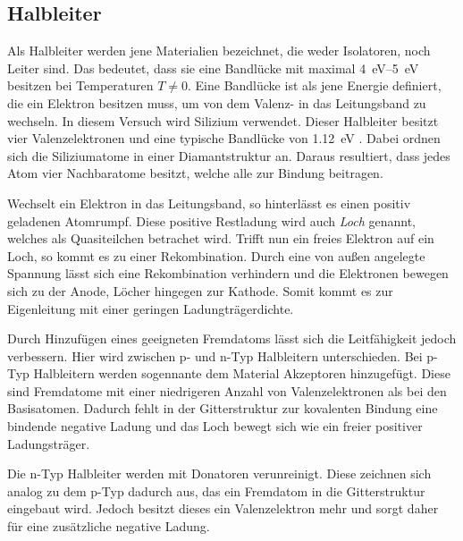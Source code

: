 \subsection{Halbleiter}
\label{sec:Halbleiter-Theorie}
Als Halbleiter werden jene Materialien bezeichnet, die weder Isolatoren, noch Leiter
sind. Das bedeutet, dass sie eine Bandlücke mit maximal \SIrange{4}{5}{\electronvolt}
besitzen bei Temperaturen $T \neq 0$. Eine Bandlücke ist
als jene Energie definiert, die ein Elektron besitzen muss, um von dem Valenz-
in das Leitungsband zu wechseln.
In diesem Versuch wird Silizium verwendet. Dieser Halbleiter besitzt vier
Valenzelektronen und eine typische Bandlücke von \SI{1.12}{\electronvolt} \cite{chemie}.
Dabei ordnen sich die Siliziumatome in einer Diamantstruktur an. Daraus
resultiert, dass jedes Atom vier Nachbaratome besitzt, welche alle zur Bindung
beitragen.

Wechselt ein Elektron in das Leitungsband, so hinterlässt es einen positiv
geladenen Atomrumpf. Diese positive Restladung wird auch \textit{Loch} genannt,
welches als Quasiteilchen betrachet wird. Trifft nun ein freies Elektron auf ein
Loch, so kommt es zu einer Rekombination. Durch eine von außen angelegte Spannung
lässt sich eine Rekombination verhindern und die Elektronen bewegen sich
zu der Anode, Löcher hingegen zur Kathode. Somit kommt es zur Eigenleitung
mit einer geringen Ladungträgerdichte.

Durch Hinzufügen eines geeigneten Fremdatoms lässt sich die Leitfähigkeit jedoch verbessern.
Hier wird zwischen p- und n-Typ Halbleitern unterschieden.
Bei p-Typ Halbleitern werden sogennante dem Material Akzeptoren hinzugefügt.
Diese sind Fremdatome mit einer niedrigeren
Anzahl von Valenzelektronen als bei den Basisatomen. Dadurch fehlt in der
Gitterstruktur zur kovalenten
Bindung eine bindende negative Ladung und das Loch bewegt sich wie ein freier
positiver Ladungsträger.

Die n-Typ Halbleiter werden mit Donatoren verunreinigt. Diese zeichnen sich analog
zu dem p-Typ dadurch aus, das ein Fremdatom in die Gitterstruktur eingebaut wird.
Jedoch besitzt dieses ein Valenzelektron mehr und sorgt daher für eine zusätzliche
negative Ladung.


